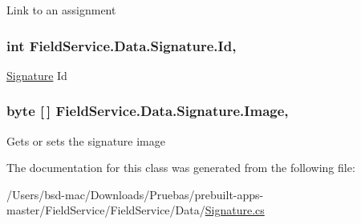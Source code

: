 Link to an assignment 

\hypertarget{class_field_service_1_1_data_1_1_signature_acf364eb6a7f3bfb6a48f83736b043379}{
\subsubsection[{Id}]{\setlength{\rightskip}{0pt plus 5cm}int Field\+Service.\+Data.\+Signature.\+Id\hspace{0.3cm}{\ttfamily [get]}, {\ttfamily [set]}}}\label{class_field_service_1_1_data_1_1_signature_acf364eb6a7f3bfb6a48f83736b043379}


\hyperlink{class_field_service_1_1_data_1_1_signature}{Signature} Id 

\hypertarget{class_field_service_1_1_data_1_1_signature_a90ac769112963b2c2db9967394679cb8}{
\subsubsection[{Image}]{\setlength{\rightskip}{0pt plus 5cm}byte \mbox{[}$\,$\mbox{]} Field\+Service.\+Data.\+Signature.\+Image\hspace{0.3cm}{\ttfamily [get]}, {\ttfamily [set]}}}\label{class_field_service_1_1_data_1_1_signature_a90ac769112963b2c2db9967394679cb8}


Gets or sets the signature image 



The documentation for this class was generated from the following file\+:\begin{DoxyCompactItemize}
\item 
/\+Users/bsd-\/mac/\+Downloads/\+Pruebas/prebuilt-\/apps-\/master/\+Field\+Service/\+Field\+Service/\+Data/\hyperlink{_signature_8cs}{Signature.\+cs}\end{DoxyCompactItemize}
